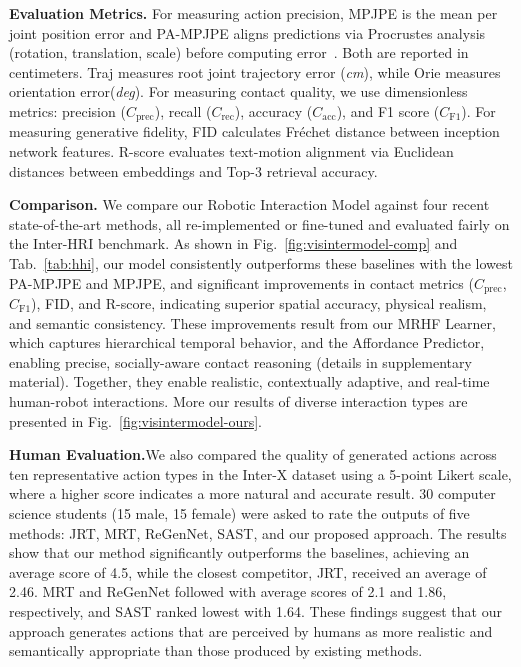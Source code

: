 \noindent\textbf{Evaluation Metrics.} 
For measuring action precision, MPJPE is the mean per joint position error and PA-MPJPE aligns predictions via Procrustes analysis (rotation, translation, scale) before computing error~\cite{deitke2020robothor}. Both are reported in centimeters. Traj measures root joint trajectory error (\textit{cm}), while Orie measures orientation error(\textit{deg}).
For measuring contact quality, we use dimensionless metrics: precision ($C_{\text{prec}}$), recall ($C_{\text{rec}}$), accuracy ($C_{\text{acc}}$), and F1 score ($C_{\text{F1}}$).
For measuring generative fidelity, FID calculates Fréchet distance between inception network features. R-score evaluates text-motion alignment via Euclidean distances between embeddings and Top-3 retrieval accuracy. 


\noindent\textbf{Comparison.}
\label{sec:baseline}
We compare our Robotic Interaction Model against four recent state-of-the-art methods, all re-implemented or fine-tuned and evaluated fairly on the Inter-HRI benchmark.
As shown in Fig.~\ref{fig:visintermodel-comp} and Tab.~\ref{tab:hhi}, our model consistently outperforms these baselines with the lowest PA-MPJPE and MPJPE, and significant improvements in contact metrics ($C_{\text{prec}}$, $C_{\text{F1}}$), FID, and R-score, indicating superior spatial accuracy, physical realism, and semantic consistency.
These improvements result from our %
MRHF Learner, which captures hierarchical temporal behavior, and the Affordance Predictor, enabling precise, socially-aware contact reasoning (details in supplementary material). Together, they enable realistic, contextually adaptive, and real-time human-robot interactions. More our results of diverse interaction types are presented in Fig.~\ref{fig:visintermodel-ours}.

\noindent\textbf{Human Evaluation.}We also compared the quality of generated actions across ten representative action types in the Inter-X dataset using a 5-point Likert scale, where a higher score indicates a more natural and accurate result. 30 computer science students (15 male, 15 female) were asked to rate the outputs of five methods: JRT, MRT, ReGenNet, SAST, and our proposed approach. The results show that our method significantly outperforms the baselines, achieving an average score of 4.5, while the closest competitor, JRT, received an average of 2.46. MRT and ReGenNet followed with average scores of 2.1 and 1.86, respectively, and SAST ranked lowest with 1.64. These findings suggest that our approach generates actions that are perceived by humans as more realistic and semantically appropriate than those produced by existing methods.



